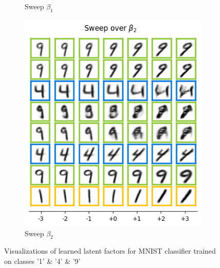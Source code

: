 \begin{figure}[h]
\begin{subfigure}[t]{.23\linewidth}
        \caption{Sweep $\beta_1$}
    \end{subfigure}
    \begin{subfigure}[t]{.23\linewidth}
        \includegraphics[width=.9\textwidth]{openreview/pictures/Figure13/beta_2.png}
        \caption{Sweep $\beta_2$}
    \end{subfigure}
       
    \caption{Visualizations of learned latent factors for MNIST classifier trained on classes '1' \& '4' \& '9'}
    \label{fig:mnist_results 149 complete}
\end{figure}

